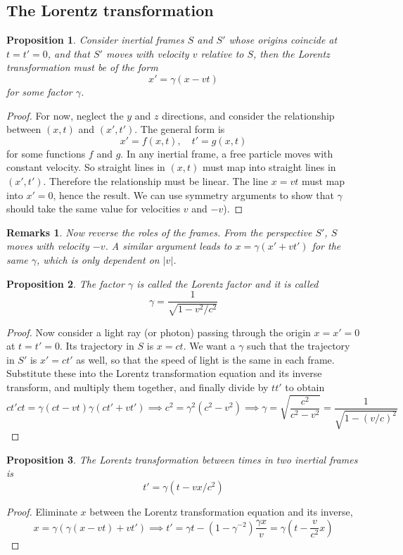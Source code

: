 \documentclass[a4paper]{article}
\newtheorem{remarks}{Remarks}[section]
\theoremstyle{new}
\newtheorem{prop}{Proposition}[section]
\begin{document}
\subsection{The Lorentz transformation}
\begin{prop}
  Consider inertial frames $S$ and $S'$ whose origins coincide at $t = t' = 0$, and that $S'$ moves with velocity $v$ relative to $S$, then the Lorentz transformation must be of the form
  $$x'=\gamma(x-vt)$$
  for some factor $\gamma$.
\end{prop}
\begin{proof}
 For now, neglect the $y$ and $z$ directions, and consider the relationship between $(x, t)$ and $(x', t')$. The general form is
$$x' = f(x, t),\quad t' = g(x, t)$$
for some functions $f$ and $g$. In any inertial frame, a free particle moves with constant velocity. So straight lines in $(x, t)$ must map into straight lines in $(x', t')$. Therefore the relationship must be linear. The line $x = vt$ must map into $x'= 0$, hence the result. We can use symmetry arguments to show that $\gamma$ should take the same value for velocities $v$ and $-v$).
\end{proof}
\begin{remarks}
Now reverse the roles of the frames. From the perspective $S'$, $S$ moves with velocity $-v$. A similar argument leads to $x=\gamma(x'+vt')$ for the same $\gamma$, which is only dependent on $|v|$.
\end{remarks}
\begin{prop}
  The factor $\gamma$ is called the Lorentz factor and it is called
  $$\gamma=\frac{1}{\sqrt{1-v^2/c^2}}$$
\end{prop}
\begin{proof}
Now consider a light ray (or photon) passing through the origin $x = x' = 0$ at $t = t' = 0$. Its trajectory in $S$ is
$x = ct$. We want a $\gamma$ such that the trajectory in $S'$ is $x' = ct'$ as well, so that the speed of light is the same in each frame. Substitute these into the Lorentz transformation equation and its inverse transform, and multiply them together, and finally divide by $tt'$ to obtain
$$ct'ct=\gamma(ct-vt)\gamma(ct'+vt')\implies c^2 = \gamma^2(c^2 - v^2)\implies \gamma = \sqrt{\frac{c^2}{c^2 - v^2}} = \frac{1}{\sqrt{1 - (v/c)^2}}$$
\end{proof}
\begin{prop}
  The Lorentz transformation between times in two inertial frames is
  $$t'=\gamma(t-vx/c^2)$$
\end{prop}
\begin{proof}
Eliminate $x$ between the Lorentz transformation equation and its inverse,
$$x = \gamma(\gamma(x - vt) + vt')\implies
t' = \gamma t - (1 - \gamma^{-2})\frac{\gamma x}{v} = \gamma\left(t - \frac{v}{c^2}x\right)$$
\end{proof}
\end{document}
